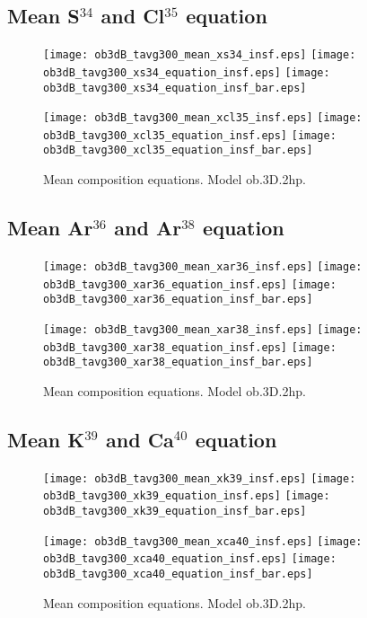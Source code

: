 \documentclass[10pt,paper=a4]{report}
\begin{document}
\newpage

\subsection{Mean S$^{34}$ and Cl$^{35}$ equation}

\begin{figure}[!h]
\centerline{
\texttt{[image: ob3dB\_tavg300\_mean\_xs34\_insf.eps]}
\texttt{[image: ob3dB\_tavg300\_xs34\_equation\_insf.eps]}
\texttt{[image: ob3dB\_tavg300\_xs34\_equation\_insf\_bar.eps]}}

\centerline{
\texttt{[image: ob3dB\_tavg300\_mean\_xcl35\_insf.eps]}
\texttt{[image: ob3dB\_tavg300\_xcl35\_equation\_insf.eps]}
\texttt{[image: ob3dB\_tavg300\_xcl35\_equation\_insf\_bar.eps]}}
\caption{Mean composition equations. Model {\sf ob.3D.2hp}. \label{fig:xs32-xs34-equations}}
\end{figure}

\newpage

\subsection{Mean Ar$^{36}$ and Ar$^{38}$ equation}

\begin{figure}[!h]
\centerline{
\texttt{[image: ob3dB\_tavg300\_mean\_xar36\_insf.eps]}
\texttt{[image: ob3dB\_tavg300\_xar36\_equation\_insf.eps]}
\texttt{[image: ob3dB\_tavg300\_xar36\_equation\_insf\_bar.eps]}}

\centerline{
\texttt{[image: ob3dB\_tavg300\_mean\_xar38\_insf.eps]}
\texttt{[image: ob3dB\_tavg300\_xar38\_equation\_insf.eps]}
\texttt{[image: ob3dB\_tavg300\_xar38\_equation\_insf\_bar.eps]}}
\caption{Mean composition equations. Model {\sf ob.3D.2hp}. \label{fig:xcl35-xar36-equations}}
\end{figure}

\newpage

\subsection{Mean K$^{39}$ and Ca$^{40}$ equation}

\begin{figure}[!h]
\centerline{
\texttt{[image: ob3dB\_tavg300\_mean\_xk39\_insf.eps]}
\texttt{[image: ob3dB\_tavg300\_xk39\_equation\_insf.eps]}
\texttt{[image: ob3dB\_tavg300\_xk39\_equation\_insf\_bar.eps]}}

\centerline{
\texttt{[image: ob3dB\_tavg300\_mean\_xca40\_insf.eps]}
\texttt{[image: ob3dB\_tavg300\_xca40\_equation\_insf.eps]}
\texttt{[image: ob3dB\_tavg300\_xca40\_equation\_insf\_bar.eps]}}
\caption{Mean composition equations. Model {\sf ob.3D.2hp}. \label{fig:xar38-xk39-equations}}
\end{figure}
\end{document}

